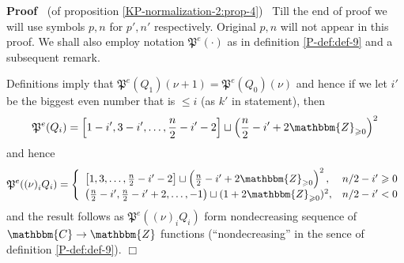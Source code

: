 \documentclass{article}
\newenvironment{proof}{\noindent\textbf{Proof\ }}{\hspace*{\fill}$\Box$\medskip}
\numberwithin{definition}{section}
\numberwithin{lemma}{section}
\numberwithin{proposition}{section}
{\theorembodyfont{\rmfamily}\newtheorem{remark}{Remark}
\numberwithin{remark}{section}
}
\begin{document}
\begin{proof}
  (of proposition \ref{KP-normalization-2:prop-4}) \ Till the end of proof we
  will use symbols $p, n$ for $p', n'$ respectively. Original $p, n$ will not
  appear in this proof. We shall also employ notation $\mathfrak{P}^e (
  \cdot)$ as in definition \ref{P-def:def-9} and a subsequent remark.
  
  Definitions imply that $\mathfrak{P}^e ( Q_1) ( \nu + 1) =\mathfrak{P}^e (
  Q_0) ( \nu)$ and hence if we let $i'$ be the biggest even number that is
  $\leqslant i$ (as $k'$ in statement), then
  \[ \mathfrak{P}^e ( Q_i) = \left[ 1 - i', 3 - i', \ldots, \frac{n}{2} - i' -
     2 \right] \sqcup \left( \frac{n}{2} - i' + 2\mathbbm{Z}_{\geqslant 0}
     \right)^2 \]
  and hence
  \[ \mathfrak{P}^e ( ( \nu)^{}_i Q_i) = \left\{ \begin{array}{ll}
       \left[ 1, 3, \ldots, \frac{n}{2} - i' - 2 \right] \sqcup \left(
       \frac{n}{2} - i' + 2\mathbbm{Z}_{\geqslant 0} \right)^2, & n / 2 - i'
       \geqslant 0\\
       \left( \frac{n}{2} - i', \frac{n}{2} - i' + 2, \ldots, - 1 \right)
       \sqcup ( 1 + 2\mathbbm{Z}_{\geqslant 0})^2, & n / 2 - i' < 0
     \end{array} \right. \]
  and the result follows as $\mathfrak{P}^e ( ( \nu)^{}_i Q_i)$ form
  nondecreasing sequence of $\mathbbm{C} \rightarrow \mathbbm{Z}$ functions
  (``nondecreasing'' in the sence of definition \ref{P-def:def-9}).
\end{proof}
\end{document}

